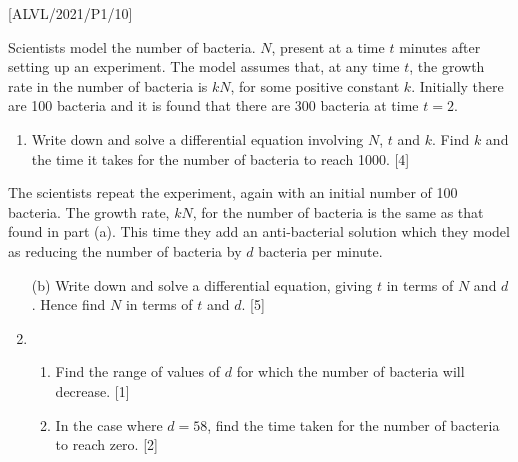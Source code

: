 \item {[}ALVL/2021/P1/10{]}

Scientists model the number of bacteria. $N$, present at a time $t$
minutes after setting up an experiment. The model assumes that, at
any time $t$, the growth rate in the number of bacteria is $kN$,
for some positive constant $k$. Initially there are 100 bacteria
and it is found that there are 300 bacteria at time $t=2$.
\begin{enumerate}
\item Write down and solve a differential equation involving $N$, $t$
and $k$. Find $k$ and the time it takes for the number of bacteria
to reach 1000. \hfill{}{[}4{]}
\end{enumerate}
The scientists repeat the experiment, again with an initial number
of 100 bacteria. The growth rate, $kN$, for the number of bacteria
is the same as that found in part (a). This time they add an anti-bacterial
solution which they model as reducing the number of bacteria by $d$
bacteria per minute.
\begin{enumerate}
\item[(b)]  Write down and solve a differential equation, giving $t$ in terms
of $N$ and $d$. Hence find $N$ in terms of $t$ and $d$. \hfill{}{[}5{]}
\item {}
\begin{enumerate}
\item Find the range of values of $d$ for which the number of bacteria
will decrease.\hfill{} {[}1{]}
\item In the case where $d=58$, find the time taken for the number of bacteria
to reach zero. \hfill{}{[}2{]}
\end{enumerate}
\end{enumerate}
